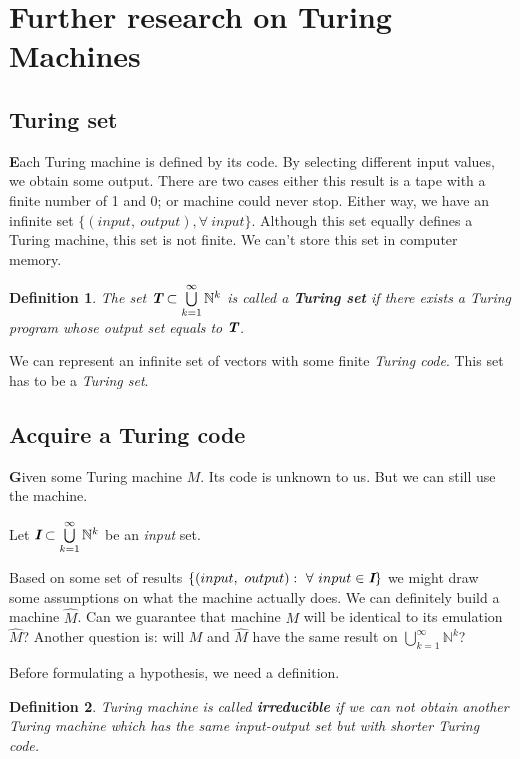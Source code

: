 \documentclass[12pt]{article}
\def\mathbi#1{\textbf{\em #1}}
\newtheorem{definition}{Definition}[section]
\begin{document}
\section{Further research on Turing Machines}
\subsection{Turing set}
\textbf{\large E}ach Turing machine is defined by its code. By selecting different input values, we obtain some output. There are two cases either this result is a tape with a finite number of 1 and 0; or machine could never stop. Either way, we have an infinite set $\{(input,\ output), \forall\ input\}$. Although this set equally defines a Turing machine, this set is not finite. We can't store this set in computer memory.

\begin{definition}
The set $\mathbi{T}\subset\bigcup\limits_{k=1}^{\infty}\mathbb{N}^k$ is called a \textbf{Turing set} if there exists a Turing program whose output set equals to $\mathbi{T}$.
\end{definition}

We can represent an infinite set of vectors with some finite \emph{Turing code}. This set has to be a \emph{Turing set}.

\subsection{Acquire a Turing code}
\textbf{\large G}iven some Turing machine $M$. Its code is unknown to us. But we can still use the machine. 

Let $\mathbi{I}\subset\bigcup\limits_{k=1}^{\infty}\mathbb{N}^k$ be an \emph{input} set.

Based on some set of results $\{(input,\ output):\  \forall\ input\in \mathbi{I}\}$ we might draw some assumptions on what the machine actually does. We can definitely build a machine $\hat{M}$. Can we guarantee that machine $M$ will be identical to its emulation $\hat{M}$? Another question is: will $M$ and $\hat{M}$ have the same result on $\bigcup\limits_{k=1}^{\infty}\mathbb{N}^k$?

Before formulating a hypothesis, we need a definition.

\begin{definition}
Turing machine is called \textbf{irreducible} if we can not obtain another Turing machine which has the same input-output set but with shorter Turing code. 
\end{definition}
\end{document}
